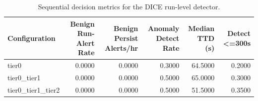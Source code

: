 \begin{table}[t]
\centering
\caption{Sequential decision metrics for the DICE run-level detector.}
\label{tab:dice_sequential_metrics}
\footnotesize
\begin{tabular}{lrrrrr}
\toprule
Configuration & Benign Run-Alert Rate & Benign Persist Alerts/hr & Anomaly Detect Rate & Median TTD (s) & Detect <=300s \\
\midrule
tier0 & 0.0000 & 0.0000 & 0.3000 & 64.5000 & 0.2000 \\
tier0_tier1 & 0.0000 & 0.0000 & 0.5000 & 65.0000 & 0.3000 \\
tier0_tier1_tier2 & 0.0000 & 0.0000 & 0.5000 & 51.5000 & 0.3500 \\
\bottomrule
\end{tabular}

\end{table}
